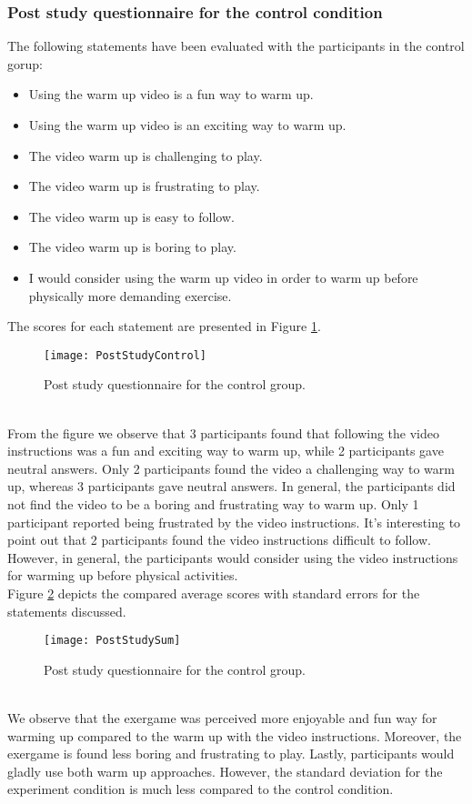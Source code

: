 \subsubsection{Post study questionnaire for the control condition} 
The following statements have been evaluated with the participants in the control gorup:
\begin{itemize}
\item Using the warm up video is a fun way to warm up.
\item Using the warm up video is an exciting way to warm up.
\item The video warm up is challenging to play.
\item The video warm up is frustrating to play.
\item The video warm up is easy to follow.
\item The video warm up is boring to play.
\item I would consider using the warm up video in order to warm up before physically more demanding exercise.
\end{itemize}
The scores for each statement are presented in Figure \ref{fig:poststudycontrol}.\\
\begin{figure}[h]
    \centering
    \texttt{[image: PostStudyControl]}
    \caption{Post study questionnaire for the control group.}
    \label{fig:poststudycontrol}
\end{figure}\\
From the figure we observe that 3 participants found that following the video instructions was a fun and exciting way to warm up, while 2 participants gave neutral answers. Only 2 participants found the video a challenging way to warm up, whereas 3 participants gave neutral answers. In general, the participants did not find the video to be a boring and frustrating way to warm up. Only 1 participant reported being frustrated by the video instructions. It's interesting to point out that 2 participants found the video instructions difficult to follow. However, in general, the participants would consider using the video instructions for warming up before physical activities.\\
Figure \ref{fig:poststudysum} depicts the compared average scores with standard errors for the statements discussed.
\begin{figure}[h]
    \centering
    \texttt{[image: PostStudySum]}
    \caption{Post study questionnaire for the control group.}
    \label{fig:poststudysum}
\end{figure}\\ We observe that the exergame was perceived more enjoyable and fun way for warming up compared to the warm up with the video instructions. Moreover, the exergame is found less boring and frustrating to play. Lastly, participants would gladly use both warm up approaches. However, the standard deviation for the experiment condition is much less compared to the control condition.
